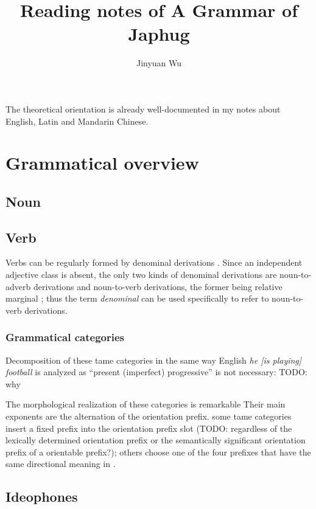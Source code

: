 \documentclass[a4paper, oneside, 12pt]{report}
\title{Reading notes of A Grammar of Japhug}
\author{Jinyuan Wu}
\newcommand*{\citechap}[1]{Ch~{#1}}
\newcommand*{\citetable}[1]{Table~{#1}}
\newcommand*{\citepage}[1]{p.~{#1}}
\newcommand*{\term}[1]{\emph{#1}}
\newcommand{\form}[1]{\emph{#1}}
\begin{document}
\maketitle

The theoretical orientation is already well-documented in my notes about English, Latin and Mandarin Chinese.

\chapter{Grammatical overview}

\section{Noun}

\section{Verb}

Verbs can be regularly formed by denominal derivations
\citep[\citechap{20}]{jacques2021grammar}.
Since an independent adjective class is absent, 
the only two kinds of denominal derivations 
are noun-to-adverb derivations and noun-to-verb derivations,
the former being relative marginal \citep[\citepage{1011}]{jacques2021grammar};
thus the term \term{denominal} can be used specifically 
to refer to noun-to-verb derivations.

\subsection{Grammatical categories}


Decomposition of these \acs{tame} categories 
in the same way English \form{he [is playing] football} 
is analyzed as ``present (imperfect) progressive'' is not necessary:
TODO: why

The morphological realization of these categories is remarkable
Their main exponents are the alternation of the orientation prefix.
some \acs{tame} categories insert a fixed prefix 
into the orientation prefix slot (TODO: regardless of the lexically determined orientation prefix 
or the semantically significant orientation prefix of a orientable prefix?);
others choose one of the four prefixes that have the same directional meaning 
in \citet[\citetable{15.1}]{jacques2021grammar}. 


\section{Ideophones}
\end{document}
